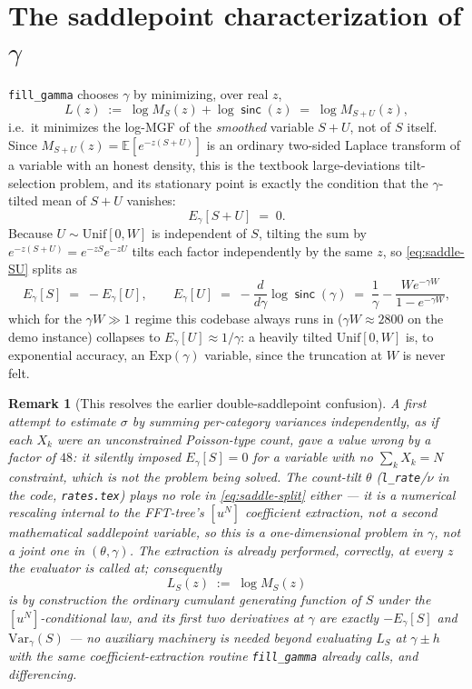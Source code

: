 \documentclass[11pt]{article}
\newtheorem{remark}{Remark}
\newcommand{\sinck}{\operatorname{\mathsf{sinc}}}
\begin{document}
\section{The saddlepoint characterization of $\gamma$}
\label{sec:saddle}

\texttt{fill\_gamma} chooses $\gamma$ by minimizing, over real $z$,
\[
  L(z)\;:=\;\log M_S(z)+\log\sinck(z)\;=\;\log M_{S+U}(z),
\]
i.e.\ it minimizes the log-MGF of the \emph{smoothed} variable $S+U$, not of $S$ itself. Since
$M_{S+U}(z)=\mathbb E[e^{-z(S+U)}]$ is an ordinary two-sided Laplace transform of a variable with an
honest density, this is the textbook large-deviations tilt-selection problem, and its stationary
point is exactly the condition that the $\gamma$-tilted mean of $S+U$ vanishes:
\begin{equation}
  \label{eq:saddle-SU}
  E_\gamma[S+U]\;=\;0 .
\end{equation}
Because $U\sim\mathrm{Unif}[0,W]$ is independent of $S$, tilting the sum by $e^{-z(S+U)}=e^{-zS}e^{-zU}$
tilts each factor independently by the same $z$, so \eqref{eq:saddle-SU} splits as
\begin{equation}
  \label{eq:saddle-split}
  E_\gamma[S]\;=\;-E_\gamma[U],\qquad
  E_\gamma[U]\;=\;-\frac{d}{d\gamma}\log\sinck(\gamma)\;=\;\frac1\gamma-\frac{W e^{-\gamma W}}{1-e^{-\gamma W}},
\end{equation}
which for the $\gamma W\gg1$ regime this codebase always runs in ($\gamma W\approx2800$ on the demo
instance) collapses to $E_\gamma[U]\approx1/\gamma$: a heavily tilted $\mathrm{Unif}[0,W]$ is, to
exponential accuracy, an $\mathrm{Exp}(\gamma)$ variable, since the truncation at $W$ is never felt.

\begin{remark}[This resolves the earlier double-saddlepoint confusion]
A first attempt to estimate $\sigma$ by summing per-category variances independently, as if each
$X_k$ were an unconstrained Poisson-type count, gave a value wrong by a factor of $48$: it silently
imposed $E_\gamma[S]=0$ for a variable with no $\sum_kX_k=N$ constraint, which is not the problem
being solved. The count-tilt $\theta$ (\texttt{l\_rate}/$\nu$ in the code, \texttt{rates.tex}) plays
no role in \eqref{eq:saddle-split} either — it is a numerical rescaling internal to the FFT-tree's
$[u^N]$ coefficient extraction, not a second mathematical saddlepoint variable, so this is a
\emph{one}-dimensional problem in $\gamma$, not a joint one in $(\theta,\gamma)$. The extraction is
already performed, correctly, at every $z$ the evaluator is called at; consequently
\[
  L_S(z)\;:=\;\log M_S(z)
\]
is by construction the ordinary cumulant generating function of $S$ under the $[u^N]$-conditional
law, and its first two derivatives at $\gamma$ are exactly $-E_\gamma[S]$ and $\mathrm{Var}_\gamma(S)$
— no auxiliary machinery is needed beyond evaluating $L_S$ at $\gamma\pm h$ with the same
coefficient-extraction routine \texttt{fill\_gamma} already calls, and differencing.
\end{remark}
\end{document}
